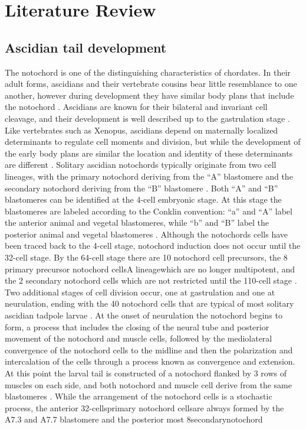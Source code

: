 \chapter{Literature Review}
\section{Ascidian tail development}

The notochord is one of the distinguishing characteristics of chordates. In their adult forms, ascidians and their vertebrate cousins bear little resemblance to one another, however during development they have similar body plans that include the notochord \cite{jeffery_minireview_2002}. Ascidians are known for their bilateral and invariant cell cleavage, and their development is well described up to the gastrulation stage \cite{nishida_cell_1983,nishida_cell_1985,nishida_cell_1987}. Like vertebrates such as Xenopus, ascidians depend on maternally localized determinants to regulate cell moments and division, but while the development of the early body plans are similar the location and identity of these determinants are different \cite{lemaire_ascidians_2008}. Solitary ascidian notochords typically originate from two cell lineages, with the primary notochord deriving from the ``A'' blastomere and the secondary notochord deriving from the ``B'' blastomere \cite{nishida_cell_1983}.  Both ``A'' and ``B'' blastomeres can be identified at the 4-cell embryonic stage. At this stage the blastomeres are labeled according to the Conklin convention: ``a'' and ``A'' label the anterior animal and vegetal blastomeres, while ``b'' and ``B'' label the posterior animal and vegetal blastomeres \cite{conklin_organization_1905} . Although the notochords cells have been traced back to the 4-cell stage, notochord induction does not occur until the 32-cell stage. By the 64-cell stage there are 10 notochord cell precursors, the 8 primary precursor notochord cells\textemdash A lineage\textemdash which are no longer multipotent, and the 2 secondary notochord cells which are not restricted until the 110-cell stage \cite{nishida_cell_1985,yasuo_ascidian_1994,yasuo_conservation_1998,lemaire_unfolding_2009}. Two additional stages of cell division occur, one at gastrulation and one at neurulation, ending with the 40 notochord cells that are typical of most solitary ascidian tadpole larvae \cite{conklin_organization_1905}. At the onset of neurulation the notochord begins to form, a process that includes the closing of the neural tube and posterior movement of the notochord and muscle cells, followed by the mediolateral convergence of the notochord cells to the midline and then the polarization and intercalation of the cells through a process known as convergence and extension\cite{swalla_mechanisms_1993}. At this point the larval tail is constructed of a notochord flanked by 3 rows of muscles on each side, and both notochord and muscle cell derive from the same blastomeres \cite{nishida_cell_1985}. While the arrangement of the notochord cells is a stochastic process, the anterior 32-cells\textemdash primary notochord cells\textemdash are always formed by the A7.3 and A7.7 blastomere and the posterior most 8\textemdash secondary\textemdash notochord 